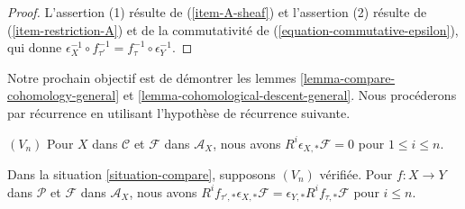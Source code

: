 \begin{proof}
L'assertion (1) résulte de (\ref{item-A-sheaf}) et l'assertion (2)
résulte de (\ref{item-restriction-A}) et de la commutativité de
(\ref{equation-commutative-epsilon}), qui donne
$\epsilon_X^{-1} \circ f_{\tau'}^{-1} = f_\tau^{-1} \circ \epsilon_Y^{-1}$.
\end{proof}

\noindent
Notre prochain objectif est de démontrer les lemmes
\ref{lemma-compare-cohomology-general} et
\ref{lemma-cohomological-descent-general}. Nous procéderons par récurrence
en utilisant l'hypothèse de récurrence suivante.

\medskip\noindent
$(V_n)$ Pour $X$ dans $\mathcal{C}$ et $\mathcal{F}$ dans $\mathcal{A}_X$,
nous avons $R^i\epsilon_{X, *}\mathcal{F} = 0$ pour $1 \leq i \leq n$.

\begin{lemma}
\label{lemma-V-implies-C-general}
Dans la situation \ref{situation-compare}, supposons $(V_n)$ vérifiée.
Pour $f : X \to Y$ dans $\mathcal{P}$ et $\mathcal{F}$ dans $\mathcal{A}_X$,
nous avons $R^if_{\tau', *}\epsilon_{X, *}\mathcal{F} =
\epsilon_{Y, *}R^if_{\tau, *}\mathcal{F}$ pour $i \leq n$.
\end{lemma}

